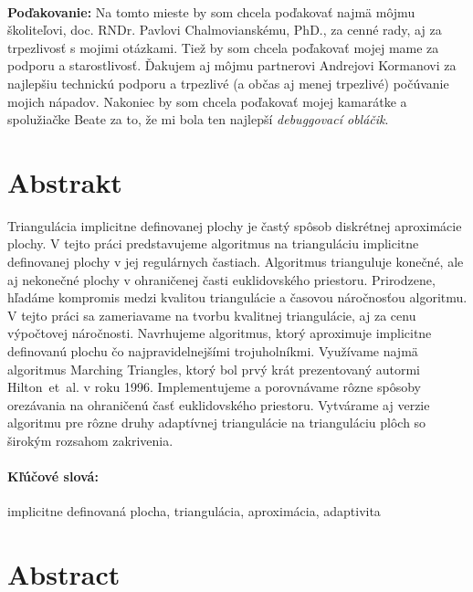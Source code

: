 \documentclass[12pt, twoside]{book}
\begin{document}

\frontmatter

\setcounter{page}{3}
\newpage 
~

\vfill
{\bf Poďakovanie:} Na tomto mieste by som chcela poďakovať najmä môjmu školiteľovi,
doc. RNDr. Pavlovi Chalmovianskému, PhD., za cenné rady, aj za trpezlivosť s mojimi 
otázkami. Tiež by som chcela poďakovať mojej mame za podporu a starostlivosť. 
Ďakujem aj môjmu partnerovi Andrejovi 
Kormanovi za najlepšiu technickú podporu a trpezlivé (a občas aj menej trpezlivé) 
počúvanie mojich nápadov. Nakoniec by som chcela poďakovať mojej kamarátke a spolužiačke
Beate za to, že mi bola ten najlepší \textit{debuggovací obláčik}.


\newpage 
\section*{Abstrakt}

Triangulácia implicitne definovanej plochy je častý spôsob diskrétnej aproximácie
plochy. V tejto práci predstavujeme algoritmus na trianguláciu implicitne definovanej plochy
v jej regulárnych častiach. Algoritmus trianguluje
konečné, ale aj nekonečné plochy v ohraničenej časti euklidovského priestoru. 
Prirodzene, hľadáme kompromis medzi kvalitou triangulácie a časovou náročnosťou algoritmu.
V tejto práci sa zameriavame na tvorbu kvalitnej triangulácie, aj za cenu výpočtovej náročnosti.
Navrhujeme algoritmus, ktorý aproximuje implicitne definovanú plochu čo najpravidelnejšími 
trojuholníkmi. Využívame najmä algoritmus Marching Triangles, ktorý bol prvý krát prezentovaný autormi
Hilton~et~al. v roku 1996.
Implementujeme a porovnávame rôzne spôsoby orezávania na ohraničenú časť euklidovského priestoru. 
Vytvárame aj verzie algoritmu pre rôzne druhy adaptívnej triangulácie na trianguláciu plôch so širokým 
rozsahom zakrivenia.

\paragraph*{Kľúčové slová:} implicitne definovaná plocha, triangulácia, aproximácia, adaptivita


\newpage 
\section*{Abstract}
\end{document}
